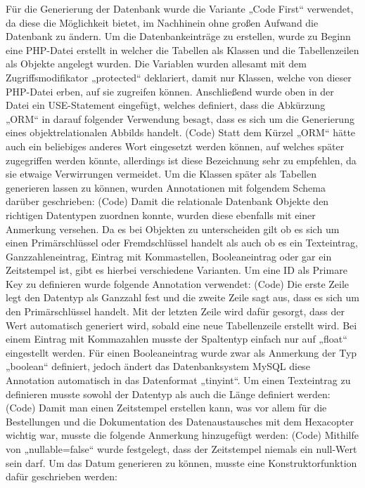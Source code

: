 Für die Generierung der Datenbank wurde die Variante „Code First“ verwendet, da diese die Möglichkeit bietet, im Nachhinein ohne großen Aufwand die Datenbank zu ändern. 
Um die Datenbankeinträge zu erstellen, wurde zu Beginn eine PHP-Datei erstellt in welcher die Tabellen als Klassen und die Tabellenzeilen als Objekte angelegt wurden. Die Variablen wurden allesamt mit dem Zugriffsmodifikator „protected“ deklariert, damit nur Klassen, welche von dieser PHP-Datei erben, auf sie zugreifen können. Anschließend wurde oben in der Datei ein USE-Statement eingefügt, welches definiert, dass die Abkürzung „ORM“ in darauf folgender Verwendung besagt, dass es sich um die Generierung eines objektrelationalen Abbilds handelt. 
(Code)
Statt dem Kürzel „ORM“ hätte auch ein beliebiges anderes Wort eingesetzt werden können, auf welches später zugegriffen werden könnte, allerdings ist diese Bezeichnung sehr zu empfehlen, da sie etwaige Verwirrungen vermeidet.
Um die Klassen später als Tabellen generieren lassen zu können, wurden Annotationen mit folgendem Schema darüber geschrieben:
(Code)
Damit die relationale Datenbank Objekte den richtigen Datentypen zuordnen konnte, wurden diese ebenfalls mit einer Anmerkung versehen. Da es bei Objekten zu unterscheiden gilt ob es sich um einen Primärschlüssel oder Fremdschlüssel handelt als auch ob es ein Texteintrag, Ganzzahleneintrag, Eintrag mit Kommastellen, Booleaneintrag oder gar ein Zeitstempel ist, gibt es hierbei verschiedene Varianten.
Um eine ID als Primare Key zu definieren wurde folgende Annotation verwendet:
(Code)
Die erste Zeile legt den Datentyp als Ganzzahl fest und die zweite Zeile sagt aus, dass es sich um den Primärschlüssel handelt. Mit der letzten Zeile wird dafür gesorgt, dass der Wert automatisch generiert wird, sobald eine neue Tabellenzeile erstellt wird.
Bei einem Eintrag mit Kommazahlen musste der Spaltentyp einfach nur auf „float“ eingestellt werden. Für einen Booleaneintrag wurde zwar als Anmerkung der Typ „boolean“ definiert, jedoch ändert das Datenbanksystem MySQL diese Annotation automatisch in das Datenformat „tinyint“.
Um einen Texteintrag zu definieren musste sowohl der Datentyp als auch die Länge definiert werden:
(Code)
Damit man einen Zeitstempel erstellen kann, was vor allem für die Bestellungen und die Dokumentation des Datenaustausches mit dem Hexacopter wichtig war, musste die folgende Anmerkung hinzugefügt werden:
(Code)
Mithilfe von „nullable=false“ wurde festgelegt, dass der Zeitstempel niemals ein null-Wert sein darf.
Um das Datum generieren zu können, musste eine Konstruktorfunktion dafür geschrieben werden:

